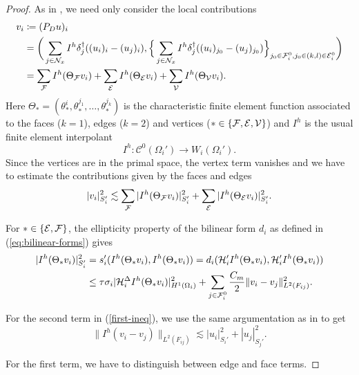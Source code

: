 \begin{proof}
    As in \cite{2D-proof}, we need only consider the local contributions
    \begin{equation*}
        \begin{split}
            v_i & \coloneqq (P_Du)_i \\
            & = \bigg( \sum_{j \in \mathcal{N}_x} I^h \delta_j^{\dag}((u_i)_i - (u_j)_i), \Big\{\sum_{j \in \mathcal{N}_x} I^h \delta_j^{\dag}((u_i)_{j_0} - (u_j)_{j_0})\Big\}_{j_0 \in \mathcal{F}_i^0, j_0 \in (k,l) \in \mathcal{E}_i^0} \bigg) \\
            & = \sum_{\mathcal{F}}I^h(\Theta_{\mathcal{F}} v_i) + \sum_{\mathcal{E}} I^h(\Theta_{\mathcal{E}}v_i) + \sum_{\mathcal{V}} I^h(\Theta_{\mathcal{V}} v_i).
        \end{split}
    \end{equation*}
    Here $\Theta_* = (\theta_*^i, \theta_*^{j_1}, \dots, \theta_*^{j_k})$ is the characteristic finite element function associated to the faces ($k = 1$), edges ($k = 2$) and vertices ($* \in \{\mathcal{F}, \mathcal{E}, \mathcal{V}\}$) and $I^h$ is the usual finite element interpolant
    \[I^h: \mathcal{C}^0(\Omega_i') \rightarrow W_i(\Omega_i').\]
    Since the vertices are in the primal space, the vertex term vanishes and we have to estimate the contributions given by the faces and edges
    \[|v_i|_{S_i'}^2 \lesssim \sum_{\mathcal{F}}|I^h(\Theta_{\mathcal{F}}v_i)|_{S_i'}^2 + \sum_{\mathcal{E}}|I^h(\Theta_{\mathcal{E}}v_i)|_{S_i'}^2.\]

    For $* \in \{\mathcal{E}, \mathcal{F}\}$, the ellipticity property of the bilinear form $d_i$ as defined in (\ref{eq:bilinear-forms}) gives
    \begin{equation}
    \label{first-ineq}
        \begin{split}
            |I^h(\Theta_*v_i)|_{S_i'}^2 & = s_i'(I^h(\Theta_* v_i), I^h(\Theta_* v_i)) = d_i(\mathcal{H}_i' I^h(\Theta_* v_i), \mathcal{H}_i' I^h(\Theta_* v_i)) \\
            & \leq \tau \sigma_i |\mathcal{H}_i^{\Delta} I^h(\Theta_* v_i)|_{H^1(\Omega_i)}^2 + \sum_{j \in \mathcal{F}_i^0} \frac{C_m}{2}\|v_i - v_j\|_{L^2(F_{ij})}^2.
        \end{split}
    \end{equation}

    For the second term in (\ref{first-ineq}), we use the same argumentation as in \cite{2D-proof} to get 
    \begin{equation}
    \label{C_m-ineq}
        \|I^h(v_i - v_j)\|_{L^2(F_{ij})} \lesssim |u_i|_{S_i'}^2 + |u_j|_{S_j'}^2.
    \end{equation}

    For the first term, we have to distinguish between edge and face terms.


\end{proof}
